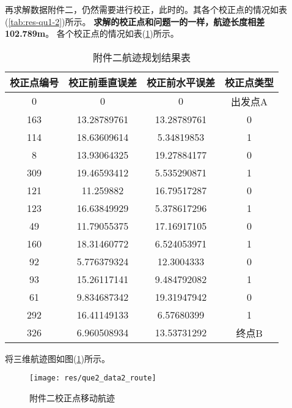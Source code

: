 \newpage
再求解数据附件二，仍然需要进行校正，此时的。其各个校正点的情况如表(\ref{tab:res-qu1-2})所示。
\textbf{求解的校正点和问题一的一样，航迹长度相差102.789m}。
各个校正点的情况如表(\ref{tab:res-qu2-2})所示。
\begin{table}[!htbp]
	\caption{附件二航迹规划结果表} 
	\label{tab:res-qu2-2}
	\centering
	\begin{tabular}{cccc} 
		\toprule[1.5pt] 
        校正点编号 & 校正前垂直误差 & 校正前水平误差 & 校正点类型 \\
		\midrule[1pt] 
        0     & 0     & 0     & 出发点A \\
    163   & 13.28789761 & 13.28789761 & \multicolumn{1}{c}{0} \\
    114   & 18.63609614 & 5.34819853 & \multicolumn{1}{c}{1} \\
    8     & 13.93064325 & 19.27884177 & \multicolumn{1}{c}{0} \\
    309   & 19.46593412 & 5.535290871 & \multicolumn{1}{c}{1} \\
    121   & 11.259882 & 16.79517287 & \multicolumn{1}{c}{0} \\
    123   & 16.63849929 & 5.378617296 & \multicolumn{1}{c}{1} \\
    49    & 11.79055375 & 17.16917105 & \multicolumn{1}{c}{0} \\
    160   & 18.31460772 & 6.524053971 & \multicolumn{1}{c}{1} \\
    92    & 5.776379324 & 12.3004333 & \multicolumn{1}{c}{0} \\
    93    & 15.26117141 & 9.484792082 & \multicolumn{1}{c}{1} \\
    61    & 9.834687342 & 19.31947942 & \multicolumn{1}{c}{0} \\
    292   & 16.41149133 & 6.57680399 & \multicolumn{1}{c}{1} \\
    326   & 6.960508934 & 13.53731292 & 终点B \\
		\bottomrule[1.5pt] 
\end{tabular}\end{table}


将三维航迹图如图(\ref{fig:res-qu2-2})所示。
\begin{figure}[htbp!]
    \centering
    \texttt{[image: res/que2\_data2\_route]}
    \caption{附件二校正点移动航迹}
    \label{fig:res-qu2-2}
\end{figure}

